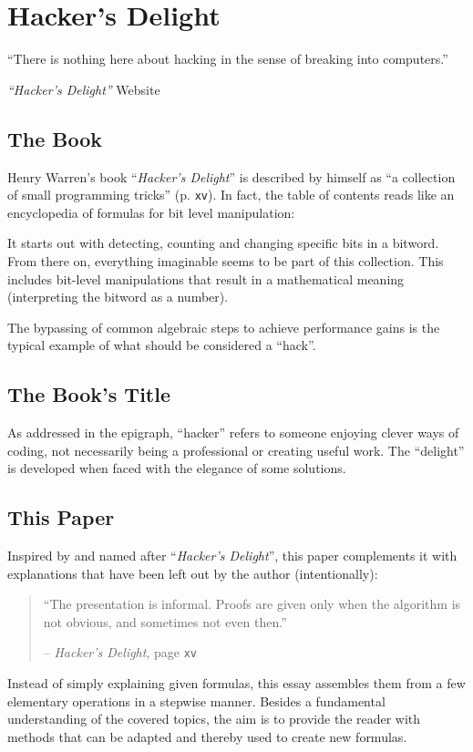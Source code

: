 \section{Hacker's Delight}\label{sec:book}
\epigraph{
``There is nothing here about hacking
in the sense of breaking into computers.''
}{
\emph{``Hacker's Delight''} Website
\cite{Warren:HD:Website}
}


\subsection*{The Book}
Henry Warren's book ``\emph{Hacker's Delight}''
is described by himself as
``a collection of small programming tricks''
\cite{Warren:2012:HD:2462741} (p. \texttt{xv}).
In fact, the table of contents reads like
an encyclopedia of formulas for bit level manipulation:

It starts out with detecting, counting and changing
specific bits in a bitword.
From there on, everything imaginable seems to be part of this collection.
This includes bit-level manipulations that result
in a mathematical meaning (interpreting the bitword as a number).

The bypassing of common algebraic steps
to achieve performance gains is the typical example
of what should be considered a ``hack''.


\subsection*{The Book's Title}
As addressed in the epigraph, ``hacker'' refers to
someone enjoying clever ways of coding,
not necessarily being a professional
or creating useful work.
The ``delight'' is developed when faced with the elegance of some solutions.


\subsection*{This Paper}
Inspired by and named after ``\emph{Hacker's Delight}'',
this paper complements it with explanations
that have been left out by the author (intentionally):

\begin{quote}
``The presentation is informal.
Proofs are given only when the algorithm is not obvious,
and sometimes not even then.''
\par\hfill -- \emph{Hacker's Delight},
page \texttt{xv} \cite{Warren:2012:HD:2462741}
\end{quote}

Instead of simply explaining given formulas,
this essay assembles them from a few elementary operations
in a stepwise manner.
Besides a fundamental understanding of the covered topics,
the aim is to provide the reader with methods
that can be adapted and thereby used to create new formulas.
